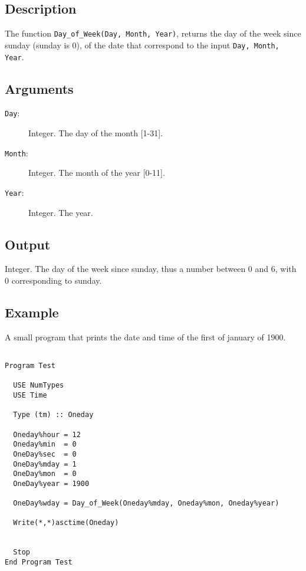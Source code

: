 \subsection{Description}

The function \texttt{Day\_of\_Week(Day, Month, Year)}, returns the
day of the week since sunday (sunday is 0), of the date that
correspond to the input \texttt{Day, Month, Year}.

\subsection{Arguments}

\begin{description}
\item[\texttt{Day}: ] Integer. The day of the month [1-31].
\item[\texttt{Month}: ] Integer. The month of the year [0-11].
\item[\texttt{Year}: ] Integer. The year.
\end{description}

\subsection{Output}

Integer. The day of the week since sunday, thus a number between 0 and
6, with 0 corresponding to sunday.

\subsection{Example}

A small program that prints the date and time of the first of
january of 1900.

\begin{verbatim}

Program Test

  USE NumTypes
  USE Time

  Type (tm) :: Oneday

  Oneday%hour = 12
  Oneday%min  = 0
  OneDay%sec  = 0
  OneDay%mday = 1
  OneDay%mon  = 0
  OneDay%year = 1900

  OneDay%wday = Day_of_Week(Oneday%mday, Oneday%mon, Oneday%year)

  Write(*,*)asctime(Oneday)


  Stop
End Program Test
\end{verbatim}


